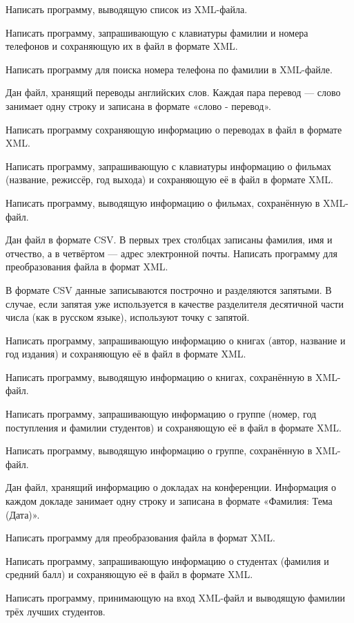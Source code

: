 Написать программу, выводящую список из XML-файла.

\task Написать программу, запрашивающую с клавиатуры фамилии и номера
телефонов и сохраняющую их в файл в формате XML.

Написать программу для поиска номера телефона по фамилии в XML-файле.

\task Дан файл, хранящий переводы английских слов. Каждая пара перевод
— слово занимает одну строку и записана в формате «слово - перевод».

Написать программу сохраняющую информацию о переводах в файл в формате
XML.

\task Написать программу, запрашивающую с клавиатуры информацию о
фильмах (название, режиссёр, год выхода) и сохраняющую её в файл в
формате XML.

Написать программу, выводящую информацию о фильмах, сохранённую в
XML-файл.

\task Дан файл в формате CSV. В первых трех столбцах записаны фамилия,
имя и отчество, а в четвёртом — адрес электронной почты. Написать
программу для преобразования файла в формат XML.

В формате CSV данные записываются построчно и разделяются запятыми. В
случае, если запятая уже используется в качестве разделителя десятичной
части числа (как в русском языке), используют точку с запятой.

\task Написать программу, запрашивающую информацию о книгах (автор,
название и год издания) и сохраняющую её в файл в формате
XML.

Написать программу, выводящую информацию о книгах, сохранённую в
XML-файл.

\task Написать программу, запрашивающую информацию о группе (номер,
год поступления и фамилии студентов) и сохраняющую её в файл в формате
XML.

Написать программу, выводящую информацию о группе, сохранённую в
XML-файл.

\task Дан файл, хранящий информацию о докладах на
конференции. Информация о каждом докладе занимает одну строку и
записана в формате «Фамилия: Тема (Дата)».

Написать программу для преобразования файла в формат XML.

\task Написать программу, запрашивающую информацию о студентах
(фамилия и средний балл) и сохраняющую её в файл в формате XML.

Написать программу, принимающую на вход XML-файл и выводящую фамилии
трёх лучших студентов.
